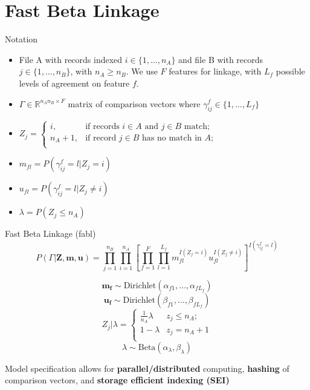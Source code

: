 \documentclass{beamer}
\begin{document}
\section{Fast Beta Linkage}
\begin{frame}{Notation}
\begin{itemize}
	\item File A with records indexed $i \in \{1, \ldots, n_A\}$ and file B with records $j \in \{1, \ldots, n_B\}$, with $n_A \geq n_B$. We use $F$ features for linkage, with $L_f$ possible levels of agreement on feature $f$.
	
	\item $\Gamma \in \mathbb{R}^{n_A n_B \times F}$ matrix of comparison vectors where $\gamma_{ij}^f \in \{1, \ldots, L_f\}$
	
	\item $Z_j = \begin{cases} 
	i,  & \text{if records } i\in A \text{ and } j\in B \text{ match}; \\
	n_A + 1,  & \text{if record } j\in B \text{ has no match in } A; \\
	\end{cases}$
	
	\item $m_{fl} = P\left(\gamma_{ij}^f = l |Z_j = i\right)$
	
	\item $u_{fl} = P\left(\gamma_{ij}^f = l |Z_j \neq i\right)$
	
	\item $\lambda = P(Z_j \leq n_A)$
\end{itemize}
\end{frame}

\begin{frame}{Fast Beta Linkage (fabl)}
	$$P(\Gamma|\mathbf{Z}, \mathbf{m}, \mathbf{u}) = \prod_{j=1}^{n_B}  \prod_{i=1}^{n_A}\left[ \prod_{f=1}^{F}\prod_{l=1}^{L_f} m_{fl}^{I(Z_j = i)}u_{fl}^{I(Z_j \neq i)}\right]^{I(\gamma_{ij}^f = l)}$$
	
	$$\mathbf{m_{f}} \sim \text{Dirichlet}(\alpha_{f1}, \ldots, \alpha_{fL_f})$$
	$$\mathbf{u_{f}} \sim \text{Dirichlet}(\beta_{f1}, \ldots, \beta_{fL_f})$$
	$$Z_j | \lambda =
	\begin{cases} 
	\frac{1}{n_A}\lambda  & z_j \leq n_A; \\
	1-\lambda &  z_j  = n_A + 1 \\
	\end{cases}$$
	$$\lambda \sim \text{Beta}(\alpha_{\lambda}, \beta_{\lambda})$$
	
	Model specification allows for \textbf{parallel/distributed} computing, \textbf{hashing} of comparison vectors, and \textbf{storage efficient indexing (SEI)}
\end{frame}
\end{document}
